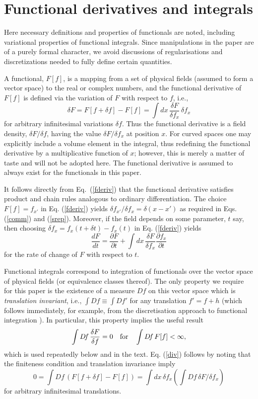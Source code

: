 \documentclass[a4paper,preprint, showpacs, aps, draft]{revtex4}
\begin{document}
{{\appendix
\section{Functional derivatives and integrals}
Here necessary definitions and properties of functionals are noted,
including variational properties of functional integrals.
Since manipulations in the paper are of a purely formal character,
we avoid discussions of regularisations and discretizations needed to
fully define certain quantities.

A functional, $F[f]$, is a mapping from a set of physical fields
(assumed to form a vector space) to the real or complex numbers, and the
functional derivative of $F[f]$ is defined via the variation of $F$ with
respect to $f$, i.e., 
\begin{equation} \label{fderiv}
\delta F= 
F[f+\delta f] - F[f] = \int dx\, \frac{\delta F}{\delta f_x}\, \delta\!f_x
\end{equation}
for arbitrary infinitesimal variations $\delta f$.  Thus the functional
derivative is a 
field density, $\delta F/\delta f$, having the value $\delta
F/\delta f_x$ at position $x$.  For curved spaces one may explicitly 
include a volume element in the integral, thus redefining the functional
derivative by a multiplicative function of $x$; however, this is 
merely a matter of taste
and will not be adopted here.  The functional derivative is
assumed to always exist for the functionals in this paper.

It follows directly from Eq.~(\ref{fderiv}) that the functional
derivative satisfies product and chain rules analogous to ordinary
differentiation. The choice $F[f] = f_{x'}$ in Eq.
(\ref{fderiv}) yields
$\delta f_{x'}/\delta f_x = \delta(x-x')$ as required in Eqs.
(\ref{comm}) and (\ref{srep}). 
Moreover, if the field depends on some parameter, $t$ say, then
choosing $\delta f_x = f_x(t+\delta t) - f_x(t)$ in Eq. (\ref{fderiv})
yields
\begin{equation} \label{rate}
\frac{dF}{dt} = \frac{\partial F}{\partial t} + \int dx\,\frac{\delta
F}{\delta f_x} \frac{\partial f_x}{\partial t} 
\end{equation}
for the rate of change of $F$ with respect to $t$.

Functional integrals correspond to integration  of functionals over the
vector space of physical fields (or equivalence classes thereof).  
The only property we require for this paper is the existence of a measure
$D\!f$ on this vector space which is {\it translation invariant}, i.e.,
$\int D\!f \equiv \int D\!f'$ for any translation $f' = f + h$ (which 
follows immediately, for example, from the discretisation approach to
functional integration \cite{brown}). In particular, this 
property implies the useful result 
\begin{equation} \label{div}
\int D\!f\,\frac{\delta F}{\delta f} = 0~~~{\rm for}~~~\int D\!f\,
F[f] < \infty ,
\end{equation}
which is used repeatedly below and in the text.  Eq. (\ref{div}) follows
by noting that the finiteness condition and translation invariance imply
\[ 0 = \int D\!f\, (F[f+\delta f] - F[f]) = \int dx\,\delta\!f_x \left(
\int D\!f\,
\delta F/\delta f_x\right) \]
for arbitrary infinitesimal translations.

}}
\end{document}
